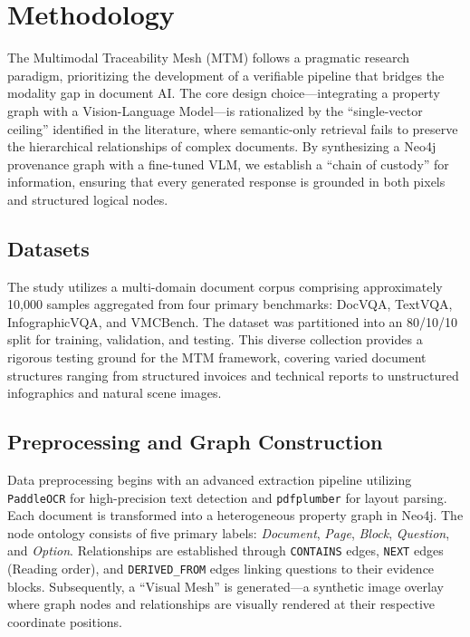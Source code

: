 \documentclass[11pt]{article}
\begin{document}
\section{Methodology}
The Multimodal Traceability Mesh (MTM) follows a pragmatic research paradigm, prioritizing the development of a verifiable pipeline that bridges the modality gap in document AI. The core design choice---integrating a property graph with a Vision-Language Model---is rationalized by the ``single-vector ceiling'' identified in the literature, where semantic-only retrieval fails to preserve the hierarchical relationships of complex documents. By synthesizing a Neo4j provenance graph with a fine-tuned VLM, we establish a ``chain of custody'' for information, ensuring that every generated response is grounded in both pixels and structured logical nodes.

\subsection{Datasets}
The study utilizes a multi-domain document corpus comprising approximately 10,000 samples aggregated from four primary benchmarks: DocVQA, TextVQA, InfographicVQA, and VMCBench. The dataset was partitioned into an 80/10/10 split for training, validation, and testing. This diverse collection provides a rigorous testing ground for the MTM framework, covering varied document structures ranging from structured invoices and technical reports to unstructured infographics and natural scene images.

\subsection{Preprocessing and Graph Construction}
Data preprocessing begins with an advanced extraction pipeline utilizing \texttt{PaddleOCR} for high-precision text detection and \texttt{pdfplumber} for layout parsing. Each document is transformed into a heterogeneous property graph in Neo4j. The node ontology consists of five primary labels: \textit{Document}, \textit{Page}, \textit{Block}, \textit{Question}, and \textit{Option}. Relationships are established through \texttt{CONTAINS} edges, \texttt{NEXT} edges (Reading order), and \texttt{DERIVED\_FROM} edges linking questions to their evidence blocks. Subsequently, a ``Visual Mesh'' is generated---a synthetic image overlay where graph nodes and relationships are visually rendered at their respective coordinate positions.
\end{document}
